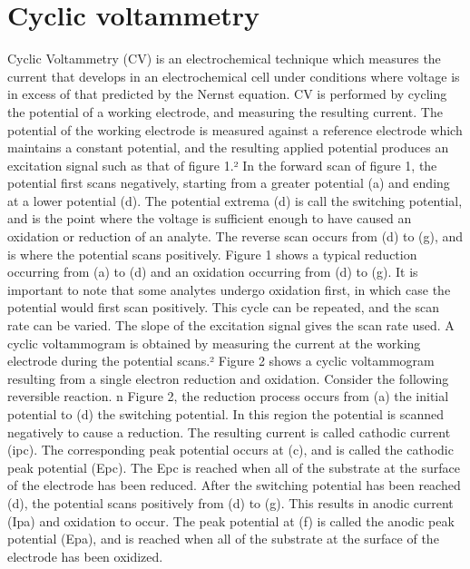 \section{Cyclic voltammetry}
Cyclic Voltammetry (CV) is an electrochemical technique which measures the current that develops in an electrochemical cell under conditions where voltage is in excess of that predicted by the Nernst equation. CV is performed by cycling the potential of a working electrode, and measuring the resulting current. The potential of the working electrode is measured against a reference electrode which maintains a constant potential, and the resulting applied potential produces an excitation signal such as that of figure 1.² In the forward scan of figure 1, the potential first scans negatively, starting from a greater potential (a) and ending at a lower potential (d). The potential extrema (d) is call the switching potential, and is the point where the voltage is sufficient enough to have caused an oxidation or reduction of an analyte. The reverse scan occurs from (d) to (g), and is where the potential scans positively. Figure 1 shows a typical reduction occurring from (a) to (d) and an oxidation occurring from (d) to (g). It is important to note that some analytes undergo oxidation first, in which case the potential would first scan positively. This cycle can be repeated, and the scan rate can be varied. The slope of the excitation signal gives the scan rate used.
A cyclic voltammogram is obtained by measuring the current at the working electrode during the potential scans.² Figure 2 shows a cyclic voltammogram resulting from a single electron reduction and oxidation. Consider the following reversible reaction. n Figure 2, the reduction process occurs from (a) the initial potential to (d) the switching potential. In this region the potential is scanned negatively to cause a reduction. The resulting current is called cathodic current (ipc). The corresponding peak potential occurs at (c), and is called the cathodic peak potential (Epc). The Epc is reached when all of the substrate at the surface of the electrode has been reduced. After the switching potential has been reached (d), the potential scans positively from (d) to (g). This results in anodic current (Ipa) and oxidation to occur. The peak potential at (f) is called the anodic peak potential (Epa), and is reached when all of the substrate at the surface of the electrode has been oxidized.
